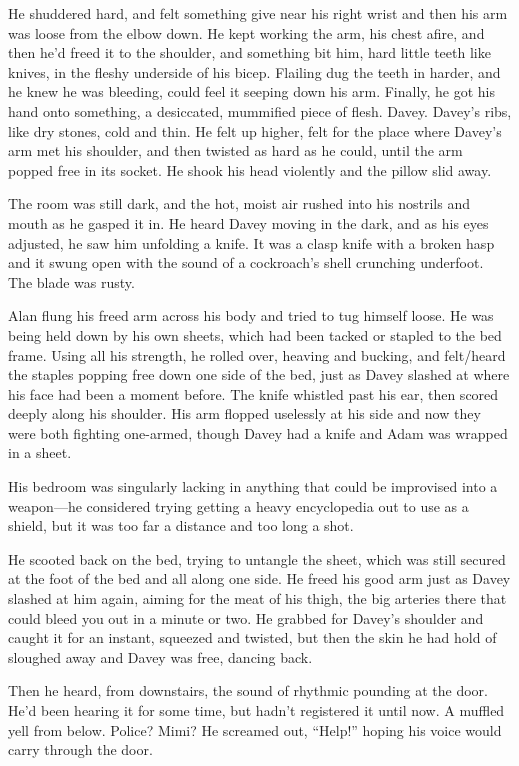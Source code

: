 \documentclass{article}
\begin{document}
He shuddered hard, and felt something give near his right wrist and
then his arm was loose from the elbow down.  He kept working the arm,
his chest afire, and then he'd freed it to the shoulder, and something
bit him, hard little teeth like knives, in the fleshy underside of his
bicep.  Flailing dug the teeth in harder, and he knew he was bleeding,
could feel it seeping down his arm.  Finally, he got his hand onto
something, a desiccated, mummified piece of flesh.  Davey.  Davey's
ribs, like dry stones, cold and thin.  He felt up higher, felt for the
place where Davey's arm met his shoulder, and then twisted as hard as
he could, until the arm popped free in its socket.  He shook his head
violently and the pillow slid away.

The room was still dark, and the hot, moist air rushed into his
nostrils and mouth as he gasped it in.  He heard Davey moving in the
dark, and as his eyes adjusted, he saw him unfolding a knife.  It was
a clasp knife with a broken hasp and it swung open with the sound of a
cockroach's shell crunching underfoot.  The blade was rusty.

Alan flung his freed arm across his body and tried to tug himself
loose.  He was being held down by his own sheets, which had been
tacked or stapled to the bed frame.  Using all his strength, he rolled
over, heaving and bucking, and felt/heard the staples popping free
down one side of the bed, just as Davey slashed at where his face had
been a moment before.  The knife whistled past his ear, then scored
deeply along his shoulder.  His arm flopped uselessly at his side and
now they were both fighting one-armed, though Davey had a knife and
Adam was wrapped in a sheet.

His bedroom was singularly lacking in anything that could be
improvised into a weapon---he considered trying getting a heavy
encyclopedia out to use as a shield, but it was too far a distance and
too long a shot.

He scooted back on the bed, trying to untangle the sheet, which was
still secured at the foot of the bed and all along one side.  He freed
his good arm just as Davey slashed at him again, aiming for the meat
of his thigh, the big arteries there that could bleed you out in a
minute or two.  He grabbed for Davey's shoulder and caught it for an
instant, squeezed and twisted, but then the skin he had hold of
sloughed away and Davey was free, dancing back.

Then he heard, from downstairs, the sound of rhythmic pounding at the
door.  He'd been hearing it for some time, but hadn't registered it
until now.  A muffled yell from below.  Police?  Mimi?  He screamed
out, ``Help!'' hoping his voice would carry through the door.
\end{document}

